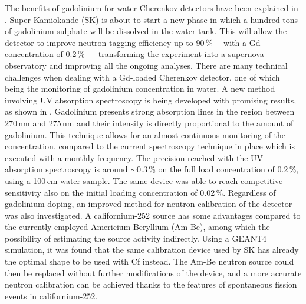The benefits of gadolinium for water Cherenkov detectors have been explained in .
Super-Kamiokande (SK) is about to start a new phase in which a hundred tons of gadolinium sulphate %
will be dissolved in the water tank.
This will allow the detector to improve neutron tagging efficiency up to 90\,\%\,---\,with a Gd concentration of 0.2\,\%\,---\,%
transforming the experiment into a supernova observatory %
and improving all the ongoing analyses.
There are many technical challenges when dealing with a Gd-loaded Cherenkov detector, %
one of which being the monitoring of gadolinium concentration in water.
A new method involving UV absorption spectroscopy is being developed with promising results, %
as shown in .
Gadolinium presents strong absorption lines in the region between 270\,nm and 275\,nm %
and their intensity is directly proportional to the amount of gadolinium.
This technique allows for an almost continuous monitoring of the concentration, %
compared to the current spectroscopy technique in place which is executed with a monthly frequency.
The precision reached with the UV absorption spectroscopy is around $\sim$0.3\,\% %
on the full load concentration of 0.2\,\%, using a 100\,cm water sample.
The same device was able to reach competitive sensitivity also on the initial loading concentration of 0.02\,\%.
Regardless of gadolinium-doping, an improved method for neutron calibration of the detector was also investigated.
A californium-252 source has some advantages compared to the currently employed Americium-Beryllium (Am-Be), %
among which the possibility of estimating the source activity indirectly.
Using a GEANT4 simulation, it was found that the same calibration device used by SK %
has already the optimal shape to be used with Cf instead.
The Am-Be neutron source could then be replaced without further modifications of the device, %
and a more accurate neutron calibration can be achieved thanks to the features of spontaneous fission events in californium-252.

